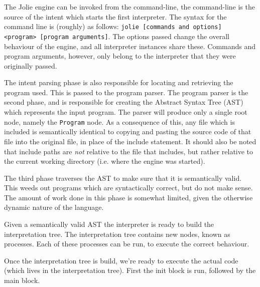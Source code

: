The Jolie engine can be invoked from the command-line, the command-line is the
source of the intent which starts the first interpreter. The syntax for the
command line is (roughly) as follows: \texttt{jolie [commands and
options] <program> [program arguments]}. The options passed change the
overall behaviour of the engine, and all interpreter instances share these.
Commands and program arguments, however, only belong to the interpreter that
they were originally passed.

The intent parsing phase is also responsible for locating and retrieving the
program used. This is passed to the program parser. The program parser is the
second phase, and is responsible for creating the Abstract Syntax Tree (AST)
which represents the input program. The parser will produce only a single root
node, namely the \verb!Program! node. As a consequence of this, any file which
is included is semantically identical to copying and pasting the source code of
that file into the original file, in place of the include statement. It should
also be noted that include paths are \emph{not} relative to the file that
includes, but rather relative to the current working directory (i.e. where the
engine was started).

The third phase traverses the AST to make sure that it is semantically valid.
This weeds out programs which are syntactically correct, but do not make sense.
The amount of work done in this phase is somewhat limited, given the otherwise
dynamic nature of the language.

Given a semantically valid AST the interpreter is ready to build the
interpretation tree. The interpretation tree contains new nodes, known as
processes. Each of these processes can be run, to execute the correct
behaviour.

Once the interpretation tree is build, we're ready to execute the actual code
(which lives in the interpretation tree). First the init block is run, followed
by the main block.
